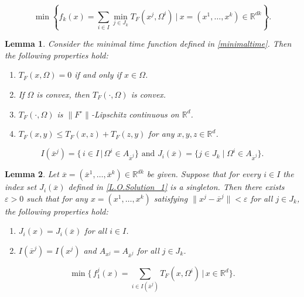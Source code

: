 \documentclass[10pt,a4paper]{amsart}
\newtheorem{lemma}{Lemma}
\begin{document}
\begin{equation} 
	\label{Generalized_Multi_Source_Weber_Problem}
	\min \left\{ f_k(x) = \sum_{i\in I} \min_{j\in J_k} T_F(x^j,\Omega^i) \ \bigg| \ x=(x^1,\dots,x^k)\in\mathbb{R}^{dk} \right\}.
\end{equation}

\begin{lemma}\label{Preliminaries_2}
	Consider the minimal time function defined in \eqref{minimaltime}. Then the following properties hold:
	\begin{enumerate}
		\item [{\rm (a)}] $T_F(x,\Omega) = 0$ if and only if $x \in \Omega$.
		\item [{\rm (b)}] If $\Omega$ is convex, then $T_F(\cdot,\Omega)$ is convex. 
		\item [{\rm (c)}] $T_F(\cdot,\Omega)$ is $\|F^\circ\|$-Lipschitz continuous on $\mathbb{R}^d$.
		\item [{\rm (d)}] $T_F(x,y) \leq T_F(x,z)+T_F(z,y)$ for any $x,y,z \in \mathbb{R}^d$.
	\end{enumerate}
\end{lemma}

\begin{equation}
	\label{L.O.Solution_1}
	I(\overline{x}^j)=\big\{\,i\in I \,\big|\, \Omega^i \in A_{\overline{x}^j} \big\} \text{ and } 
	J_i(\overline{x})=\{j\in J_k \mid \Omega^i \in A_{\overline{x}^j}\}.
\end{equation}

\begin{lemma}
	\label{L.O.Solution_2}
	Let $\overline{x}=(\overline{x}^1,\dots,\overline{x}^k)\in \mathbb{R}^{dk}$ be given. Suppose that for every $i\in I$ the index set $J_i(\overline{x})$ defined in \eqref{L.O.Solution_1} is a singleton. Then there exists $\varepsilon>0$ such that for any 
	$x=(x^1,\dots,x^k)$ satisfying $\|x^j-\overline{x}^j\|<\varepsilon$ for all $j \in J_k$, \color{black}the following properties hold:
	\begin{enumerate}
		\item [\rm {(a)}] $J_i(x)=J_i(\overline{x})$ for all $i \in I$.
		\item [\rm {(b)}] $I(\overline{x}^j)=I(x^j)$ and $A_{x^j}=A_{\overline{x}^j}$ for all $j \in J_k$.
	\end{enumerate}
\end{lemma}

\begin{equation}\label{single_source_Weber_problem}
	\min \biggl\{\,f^j_{1}(x)=\sum_{i \in I(\overline{x}^j)} T_F(x,\Omega^i)\,\bigg|\, x\in \mathbb{R}^d \biggr\}.
\end{equation}
\end{document}
